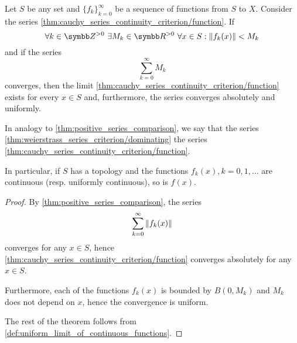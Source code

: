 \begin{corollary}\label{thm:weierstrass_series_criterion}\cite[]{Фихтенгольц1968/2}
  Let \( S \) be any set and \( \{ f_k \}_{k=0}^\infty \) be a sequence of functions from \( S \) to \( X \). Consider the series \cref{thm:cauchy_series_continuity_criterion/function}. If
  \begin{equation*}
    \forall k \in \BZ^{>0} \ \exists M_k \in \BR^{>0} \ \forall x \in S : \Norm{f_k(x)} < M_k
  \end{equation*}
  and if the series
  \begin{equation}\label{thm:weierstrass_series_criterion/dominating}
    \sum_{k=0}^\infty M_k
  \end{equation}
  converges, then the limit \cref{thm:cauchy_series_continuity_criterion/function} exists for every \( x \in S \) and, furthermore, the series converges absolutely and uniformly.

  In analogy to \cref{thm:positive_series_comparison}, we say that the series \cref{thm:weierstrass_series_criterion/dominating}  the series \cref{thm:cauchy_series_continuity_criterion/function}.

  In particular, if \( S \) has a topology and the functions \( f_k(x), k = 0, 1, \ldots \) are continuous (resp. uniformly continuous), so is \( f(x) \).
\end{corollary}
\begin{proof}
  By \cref{thm:positive_series_comparison}, the series
  \begin{equation*}
    \sum_{k=0}^\infty \left\Vert f_k(x) \right\Vert
  \end{equation*}
  converges for any \( x \in S \), hence \cref{thm:cauchy_series_continuity_criterion/function} converges absolutely for any \( x \in S \).

  Furthermore, each of the functions \( f_k(x) \) is bounded by \( B(0, M_k) \) and \( M_k \) does not depend on \( x \), hence the convergence is uniform.

  The rest of the theorem follows from \cref{def:uniform_limit_of_continuous_functions}.
\end{proof}

